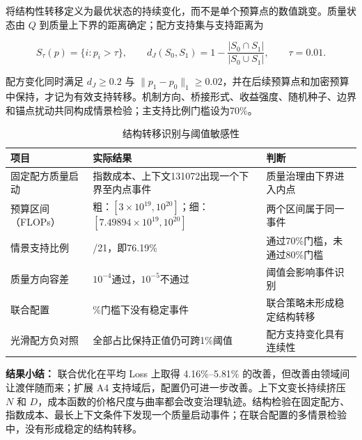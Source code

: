 将结构性转移定义为最优状态的持续变化，而不是单个预算点的数值跳变。质量状态由 $Q$ 到质量上下界的距离确定；配方支持集与支持距离为

\begin{equation}\label{eq:q3_20}
    S_\tau(p)=\{i:p_i>\tau\},\qquad
    d_J(S_0,S_1)=1-\frac{|S_0\cap S_1|}{|S_0\cup S_1|},
    \qquad \tau=0.01.
\end{equation}

配方变化同时满足 $d_J\ge0.2$ 与 $\|p_1-p_0\|_1\ge0.02$，并在后续预算点和加密预算中保持，才记为有效支持转移。机制方向、桥接形式、收益强度、随机种子、边界和锚点扰动共同构成情景检验；主支持比例门槛设为70\%。

\begin{table}[H]\centering\setlength{\tabcolsep}{3pt}\renewcommand{\arraystretch}{1.12}
    \caption{结构转移识别与阈值敏感性}\label{tab:q3_8}
    \begin{tabularx}{\textwidth}{>{\raggedright\arraybackslash}p{3.570159cm}>{\raggedright\arraybackslash}p{7.636173cm}>{\raggedright\arraybackslash}X}\toprule
        项目          & 实际结果                                                            & 判断                 \\
        \midrule
        固定配方质量启动    & 指数成本、上下文131072出现一个下界至内点事件                                       & 质量治理由下界进入内点        \\
        预算区间（FLOPs） & 粗：$[3\times10^{19},10^{20}]$；细：$[7.49894\times10^{19},10^{20}]$ & 两个区间属于同一事件         \\
        情景支持比例      & 16/21，即76.19\%                                                  & 通过70\%门槛，未通过80\%门槛 \\
        质量方向容差      & $10^{-4}$通过，$10^{-5}$不通过                                        & 阈值会影响事件识别          \\
        联合配置        & 70\%门槛下没有稳定事件                                                   & 联合策略未形成稳定结构转移      \\
        光滑配方负对照     & 全部占比保持正值仍可跨1\%阈值                                                & 配方支持变化具有连续性        \\
        \bottomrule\end{tabularx}
\end{table}

\textbf{结果小结：} 联合优化在平均 Loss 上取得 4.16\%--5.81\% 的改善，但改善由领域间让渡伴随而来；扩展 A4 支持域后，配置仍可进一步改善。上下文变长持续挤压 $N$ 和 $D$，成本函数的价格尺度与曲率都会改变治理轨迹。结构检验在固定配方、指数成本、最长上下文条件下发现一个质量启动事件；在联合配置的多情景检验中，没有形成稳定的结构转移。

